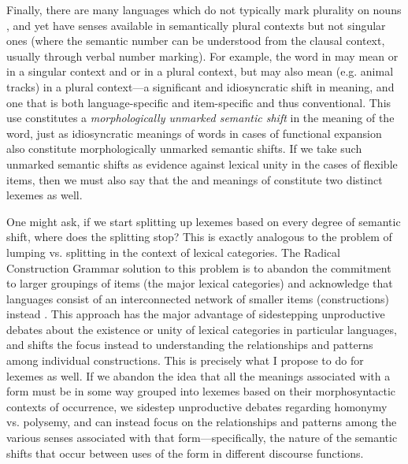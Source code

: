 Finally, there are many languages which do not typically mark plurality on nouns \parencite{Dryer2013}, and yet have senses available in semantically plural contexts but not singular ones (where the semantic number can be understood from the clausal context, usually through verbal number marking). For example, the word  in  may mean  or  in a singular context and  or  in a plural context, but may also mean  (e.g. animal tracks) in a plural context—a significant and idiosyncratic shift in meaning, and one that is both language-specific and item-specific and thus conventional. This use constitutes a \emph{morphologically unmarked semantic shift} in the meaning of the word, just as idiosyncratic meanings of words in cases of functional expansion also constitute morphologically unmarked semantic shifts. If we take such unmarked semantic shifts as evidence against lexical unity in the cases of flexible items, then we must also say that the  and  meanings of  constitute two distinct lexemes as well.

One might ask, if we start splitting up lexemes based on every degree of semantic shift, where does the splitting stop? This is exactly analogous to the problem of lumping vs. splitting in the context of lexical categories. The Radical Construction Grammar solution to this problem is to abandon the commitment to larger groupings of items (the major lexical categories) and acknowledge that languages consist of an interconnected network of smaller items (constructions) instead \parencite{Croft2001b}. This approach has the major advantage of sidestepping unproductive debates about the existence or unity of lexical categories in particular languages, and shifts the focus instead to understanding the relationships and patterns among individual constructions. This is precisely what I propose to do for lexemes as well. If we abandon the idea that all the meanings associated with a form must be in some way grouped into lexemes based on their morphosyntactic contexts of occurrence, we sidestep unproductive debates regarding homonymy vs. polysemy, and can instead focus on the relationships and patterns among the various senses associated with that form—specifically, the nature of the semantic shifts that occur between uses of the form in different discourse functions.


